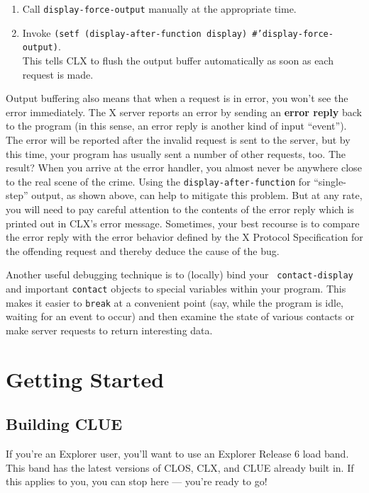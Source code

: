 \begin{enumerate}
\item Call {\tt display-force-output} manually at the appropriate time.
\item Invoke {\tt (setf (dis\-play-af\-ter-func\-tion dis\-play)
\#'dis\-play-force-out\-put)}. \\
This tells CLX to flush the
output buffer automatically as soon as each request
is made.
\end{enumerate}

Output buffering also means that when a request is in error, you won't
see the error immediately. The X server reports an error by sending an {\bf
error reply} back to the program (in this sense, an error reply is another kind
of input ``event'').
The error will be reported after the invalid
request is sent to the server, but by this time, your program has usually sent a
number of other requests, too. The result? When you arrive at the error handler,
you almost never be anywhere close to the real scene of the crime.
Using the {\tt display-after-function} for
``single-step'' output, as shown above, can help to mitigate this problem. But
at any rate, you will need to pay careful attention to the contents of the error
reply which is printed out in CLX's error message. Sometimes, your best recourse
is to compare the error
reply with the error behavior defined by the X Protocol Specification for the
offending request and thereby deduce the cause of the bug.

Another useful debugging technique is to (locally) bind your {\tt
contact-display} and important {\tt contact} objects to special variables within
your program. This makes it easier to {\tt break} at a convenient
point (say, while the program is idle, waiting for an event to occur) and then
examine the state of various contacts or make server requests to return
interesting data.

\section{Getting Started\label{sec:getting-started}}
\subsection{Building CLUE}
If you're an Explorer user, you'll want to use an Explorer Release 6 load
band. This band has the latest versions of CLOS, CLX, and CLUE already built in.
If this applies to you, you can stop here --- you're ready to go!

